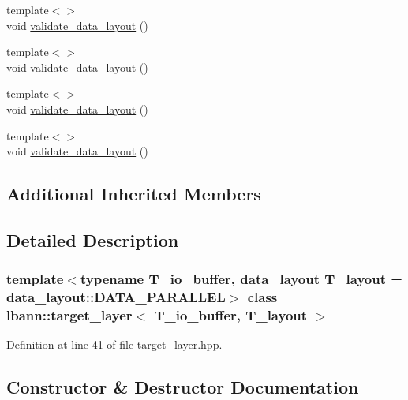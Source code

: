 \begin{DoxyCompactItemize}
\item 
{\footnotesize template$<$$>$ }\\void \hyperlink{classlbann_1_1target__layer_a00860943418bd3c473056ec959542a6e}{validate\+\_\+data\+\_\+layout} ()
\item 
{\footnotesize template$<$$>$ }\\void \hyperlink{classlbann_1_1target__layer_a2e427388dd45925b3ae4b2479b6ff56c}{validate\+\_\+data\+\_\+layout} ()
\item 
{\footnotesize template$<$$>$ }\\void \hyperlink{classlbann_1_1target__layer_a24db2fc4df186477d6d95e7353da4d8c}{validate\+\_\+data\+\_\+layout} ()
\item 
{\footnotesize template$<$$>$ }\\void \hyperlink{classlbann_1_1target__layer_a82911af2df15e9ddbd40d70e9efa4bb3}{validate\+\_\+data\+\_\+layout} ()
\end{DoxyCompactItemize}
\subsection*{Additional Inherited Members}


\subsection{Detailed Description}
\subsubsection*{template$<$typename T\+\_\+io\+\_\+buffer, data\+\_\+layout T\+\_\+layout = data\+\_\+layout\+::\+D\+A\+T\+A\+\_\+\+P\+A\+R\+A\+L\+L\+EL$>$\newline
class lbann\+::target\+\_\+layer$<$ T\+\_\+io\+\_\+buffer, T\+\_\+layout $>$}



Definition at line 41 of file target\+\_\+layer.\+hpp.



\subsection{Constructor \& Destructor Documentation}
\mbox{\label{classlbann_1_1target__layer_ab06729051345c739c33ea445ceed100a}} 
